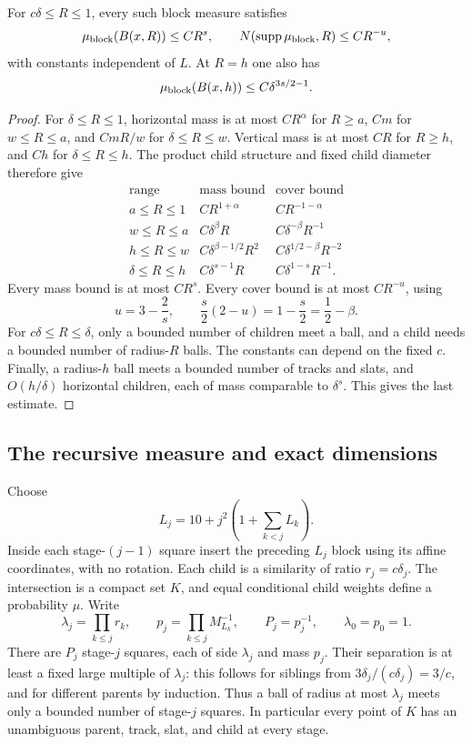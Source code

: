 \begin{lemma}\label{sourceobs:block}
For \(c\delta\le R\le1\), every such block measure satisfies
\[
 \mu_{\rm block}(B(x,R))\le CR^s,\qquad
 N(\operatorname{supp}\mu_{\rm block},R)\le CR^{-u},
\]
with constants independent of \(L\). At \(R=h\) one also has
\[
 \mu_{\rm block}(B(x,h))\le C\delta^{3s/2-1}.
\]
\end{lemma}
\begin{proof}
For \(\delta\le R\le1\), horizontal mass is at most \(CR^\alpha\)
for \(R\ge a\), \(Cm\) for \(w\le R\le a\), and \(CmR/w\)
for \(\delta\le R\le w\). Vertical mass is at most \(CR\) for
\(R\ge h\), and \(Ch\) for \(\delta\le R\le h\).
The product child structure and fixed child diameter therefore give
\[
\begin{array}{c|c|c}
\text{range}&\text{mass bound}&\text{cover bound}\\ \hline
a\le R\le1&CR^{1+\alpha}&CR^{-1-\alpha}\\
w\le R\le a&C\delta^\beta R&C\delta^{-\beta}R^{-1}\\
h\le R\le w&C\delta^{\beta-1/2}R^2
 &C\delta^{1/2-\beta}R^{-2}\\
\delta\le R\le h&C\delta^{s-1}R
 &C\delta^{1-s}R^{-1}.
\end{array}
\]
Every mass bound is at most \(CR^s\). Every cover bound is at
most \(CR^{-u}\), using
\[
 u=3-\frac2s,\qquad
 \frac{s}{2}(2-u)=1-\frac{s}{2}=\frac12-\beta.
\]
For \(c\delta\le R\le\delta\), only a bounded number of children
meet a ball, and a child needs a bounded number of radius-\(R\)
balls. The constants can depend on the fixed \(c\).
Finally, a radius-\(h\) ball meets a bounded number of tracks and
slats, and \(O(h/\delta)\) horizontal children, each of mass
comparable to \(\delta^s\). This gives the last estimate.
\end{proof}

\subsection{The recursive measure and exact dimensions}

Choose
\begin{equation}\label{sourceobs:depths}
 L_j=10+j^2\left(1+\sum_{k<j}L_k\right).
\end{equation}
Inside each stage-\((j-1)\) square insert the preceding \(L_j\)
block using its affine coordinates, with no rotation. Each child
is a similarity of ratio \(r_j=c\delta_j\). The intersection is
a compact set \(K\), and equal conditional child weights define a
probability \(\mu\). Write
\[
 \lambda_j=\prod_{k\le j}r_k,\qquad
 p_j=\prod_{k\le j}M_{L_k}^{-1},\qquad P_j=p_j^{-1},
 \qquad \lambda_0=p_0=1.
\]
There are \(P_j\) stage-\(j\) squares, each of side \(\lambda_j\)
and mass \(p_j\). Their separation is at least a fixed large
multiple of \(\lambda_j\): this follows for siblings from
\(3\delta_j/(c\delta_j)=3/c\), and for different parents by
induction. Thus a ball of radius at most \(\lambda_j\) meets
only a bounded number of stage-\(j\) squares. In particular every
point of \(K\) has an unambiguous parent, track, slat, and child
at every stage.

